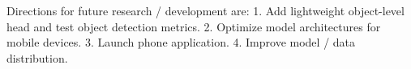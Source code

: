 \documentclass[10pt,twocolumn,letterpaper]{article}
\begin{document}
Directions for future research / development are:
1. Add lightweight object-level head and test object detection metrics.
2. Optimize model architectures for mobile devices.
3. Launch phone application.
4. Improve model / data distribution.


{\small


}
%
\end{document}
